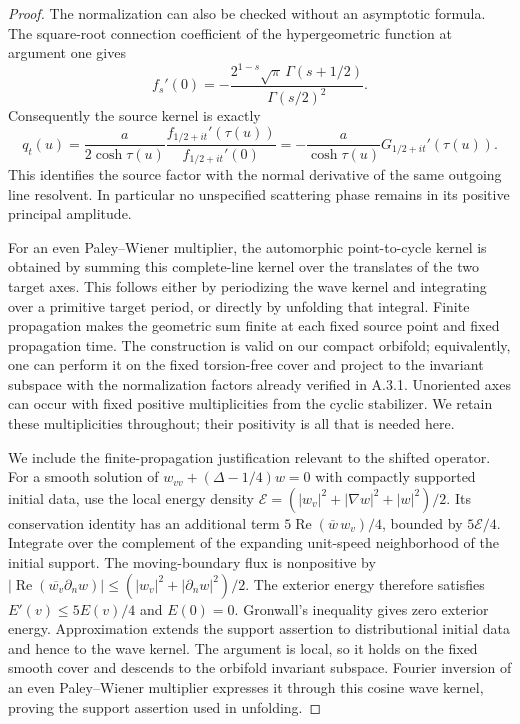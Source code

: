 \begin{proof}
The normalization can also be checked without an asymptotic formula.
The square-root connection coefficient of the hypergeometric function
at argument one gives
\[
 f_s'(0)=-\frac{2^{1-s}\sqrt\pi\,\Gamma(s+1/2)}
                         {\Gamma(s/2)^2}.
\]
Consequently the source kernel is exactly
\[
 q_t(u)=\frac{a}{2\cosh\tau(u)}
              \frac{f_{1/2+it}'(\tau(u))}{f_{1/2+it}'(0)}
        =-\frac{a}{\cosh\tau(u)}G_{1/2+it}'(\tau(u)).
\]
This identifies the source factor with the normal derivative of
the same outgoing line resolvent. In particular no unspecified
scattering phase remains in its positive principal amplitude.

For an even Paley--Wiener multiplier, the automorphic point-to-cycle
kernel is obtained by summing this complete-line kernel over
the translates of the two target axes.
This follows either by periodizing the wave kernel and integrating
over a primitive target period, or directly by unfolding that integral.
Finite propagation makes the geometric sum finite at each fixed
source point and fixed propagation time.
The construction is valid on our compact orbifold; equivalently,
one can perform it on the fixed torsion-free cover and project to
the invariant subspace with the normalization factors already
verified in A.3.1.
Unoriented axes can occur with fixed positive multiplicities from
the cyclic stabilizer. We retain these multiplicities throughout;
their positivity is all that is needed here.

We include the finite-propagation justification relevant to the
shifted operator. For a smooth solution of
$w_{vv}+(\Delta-1/4)w=0$ with compactly supported initial data,
use the local energy density
$\mathcal E=(|w_v|^2+|\nabla w|^2+|w|^2)/2$.
Its conservation identity has an additional term
$5\operatorname{Re}(\overline w\,w_v)/4$, bounded by
$5\mathcal E/4$.
Integrate over the complement of the expanding unit-speed
neighborhood of the initial support.
The moving-boundary flux is nonpositive by
$|\operatorname{Re}(\overline{w_v}\partial_n w)|
 \leq(|w_v|^2+|\partial_nw|^2)/2$.
The exterior energy therefore satisfies
$E'(v)\leq5E(v)/4$ and $E(0)=0$.
Gronwall's inequality gives zero exterior energy.
Approximation extends the support assertion to distributional
initial data and hence to the wave kernel.
The argument is local, so it holds on the fixed smooth cover
and descends to the orbifold invariant subspace.
Fourier inversion of an even Paley--Wiener multiplier expresses
it through this cosine wave kernel, proving the support assertion
used in unfolding.


\end{proof}
